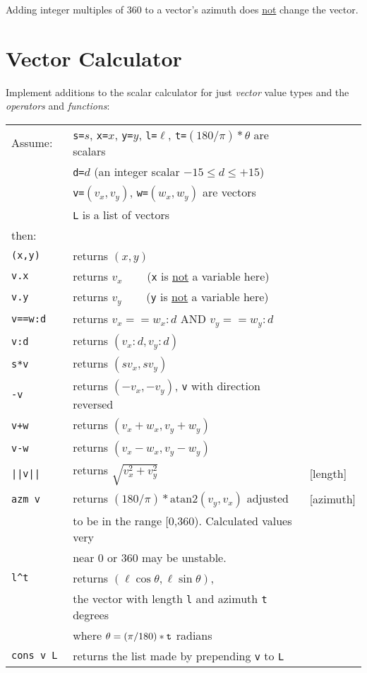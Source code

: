 \documentclass[12pt]{article}
\begin{document}
Adding integer multiples of 360 to a vector's
azimuth does \underline{not} change the vector.

\newpage

\section{Vector Calculator}
Implement additions to the scalar calculator for just {\em vector}
value types and the {\em operators} and {\em functions}:
\begin{center}
\begin{tabular}{l@{~~~~~}l@{~~~~~}l}
Assume: & {\tt s=}$s$, {\tt x=}$x$, {\tt y=$y$},
          {\tt l=$\ell$}, {\tt t=$(180/\pi)*\theta$}
          are scalars \\
	& {\tt d=}$d$ (an integer scalar $-15\le d\le +15$) \\
	& {\tt v=}$(v_x,v_y)$, {\tt w=}$(w_x,w_y)$ are vectors \\
	& {\tt L} is a list of vectors \\
then: \\[1ex]
\tt (x,y) & returns $(x,y)$ \\
\tt v.x & returns $v_x$ ~~~ ({\tt x} is \underline{not} a variable here) \\
\tt v.y & returns $v_y$ ~~~ ({\tt y} is \underline{not} a variable here) \\
\tt v==w:d & returns $v_x==w_x:d$ AND $v_y==w_y:d$ \\
\tt v:d & returns $(v_x:d,v_y:d)$ \\
\tt s*v & returns $(s v_x, s v_y )$ \\
\tt -v & returns $( -v_x, -v_y )$, {\tt v} with direction reversed \\
\tt v+w & returns $(v_x + w_x, v_y + w_y)$ \\
\tt v-w & returns $(v_x - w_x, v_y - w_y)$ \\
\tt ||v|| & returns $\sqrt{v_x^2 + v_y^2}$ & [length] \\
\tt azm v & returns $(180/\pi)*\mathrm{atan2}(v_y,v_x)$ adjusted & [azimuth] \\
          & to be in the range [0,360).  Calculated values very \\
	  & near 0 or 360 may be unstable. \\
\tt l\textasciicircum t
          & returns $(\ell\cos\theta,\ell\sin\theta)$, \\
	  & the vector with length {\tt l} and azimuth {\tt t} degrees \\
	  & where $\theta = (\pi/180)*{\tt t}$ radians \\
\tt cons v L & returns the list made by prepending {\tt v} to {\tt L} \\
\end{tabular}
\end{center}
\end{document}
